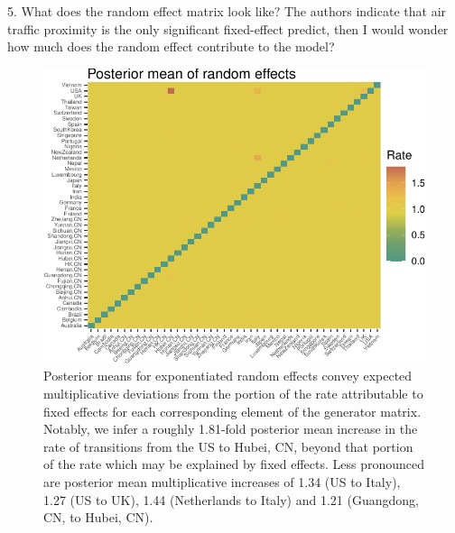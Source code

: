 \documentclass[12pt]{article}
\begin{document}
5. What does the random effect matrix look like? The authors indicate that air traffic proximity is the only significant fixed-effect predict, then I would wonder how much does the random effect contribute to the model?




\setcounter{figure}{4}
\begin{figure}[t]
	\centering
	\includegraphics[width=0.7\linewidth]{figures/randEffects.pdf}
	\caption{Posterior means for exponentiated random effects convey expected multiplicative deviations from the portion of the rate attributable to fixed effects for each corresponding element of the generator matrix.  Notably, we infer a roughly 1.81-fold posterior mean increase in the rate of transitions from the US to Hubei, CN, beyond that portion of the rate which may be explained by fixed effects.  Less pronounced are posterior mean multiplicative increases of 1.34 (US to Italy), 1.27 (US to UK), 1.44 (Netherlands to Italy) and 1.21 (Guangdong, CN, to Hubei, CN).}%
\end{figure}
\end{document}
